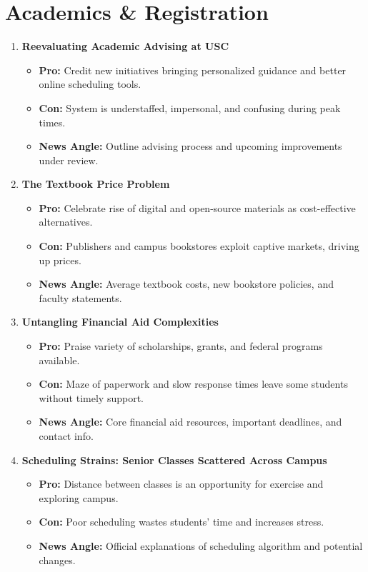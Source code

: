 \documentclass{article}
\begin{document}
\section*{Academics \& Registration}

\begin{enumerate}[leftmargin=*]
    \item \textbf{Reevaluating Academic Advising at USC}
    \begin{itemize}
        \item \textbf{Pro:} Credit new initiatives bringing personalized guidance and better online scheduling tools.
        \item \textbf{Con:} System is understaffed, impersonal, and confusing during peak times.
        \item \textbf{News Angle:} Outline advising process and upcoming improvements under review.
    \end{itemize}

    \item \textbf{The Textbook Price Problem}
    \begin{itemize}
        \item \textbf{Pro:} Celebrate rise of digital and open-source materials as cost-effective alternatives.
        \item \textbf{Con:} Publishers and campus bookstores exploit captive markets, driving up prices.
        \item \textbf{News Angle:} Average textbook costs, new bookstore policies, and faculty statements.
    \end{itemize}

    \item \textbf{Untangling Financial Aid Complexities}
    \begin{itemize}
        \item \textbf{Pro:} Praise variety of scholarships, grants, and federal programs available.
        \item \textbf{Con:} Maze of paperwork and slow response times leave some students without timely support.
        \item \textbf{News Angle:} Core financial aid resources, important deadlines, and contact info.
    \end{itemize}

    \item \textbf{Scheduling Strains: Senior Classes Scattered Across Campus}
    \begin{itemize}
        \item \textbf{Pro:} Distance between classes is an opportunity for exercise and exploring campus.
        \item \textbf{Con:} Poor scheduling wastes students' time and increases stress.
        \item \textbf{News Angle:} Official explanations of scheduling algorithm and potential changes.
    \end{itemize}


\end{enumerate}
\end{document}
